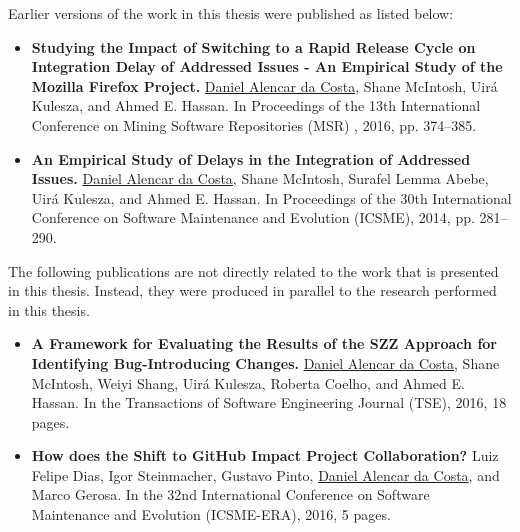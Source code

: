 \begin{sloppypar}

\noindent Earlier versions of the work in this thesis were published as listed below:

\begin{itemize}

\item \textbf{Studying the Impact of Switching to a Rapid Release Cycle on
Integration Delay of Addressed Issues - An Empirical Study of the Mozilla
Firefox Project.} 
\underline{Daniel Alencar da
	Costa}, Shane McIntosh, Uir\'{a} Kulesza,
	and Ahmed E. Hassan. In Proceedings of the 13th International
Conference on Mining Software Repositories (MSR) , 2016, pp. 374--385.\\
 \faTrophy

\item \textbf{An Empirical Study of Delays in the Integration of Addressed
Issues.} \underline{Daniel Alencar da Costa}, Shane McIntosh, Surafel Lemma Abebe,
Uir\'{a} Kulesza, and Ahmed E. Hassan. In Proceedings of the 30th International
Conference on Software Maintenance and Evolution (ICSME), 2014, pp. 281--290.\\
 \faTrophy

\end{itemize}

\noindent The following publications are not directly related to the work that
is presented in this thesis. Instead, they were produced in parallel to the
research performed in this thesis.

\begin{itemize}

\item \textbf{A Framework for Evaluating the Results of the SZZ Approach for
	Identifying Bug-Introducing Changes.} \underline{Daniel Alencar da
	Costa}, Shane McIntosh, Weiyi Shang, Uir\'{a} Kulesza, Roberta Coelho,
	and Ahmed E. Hassan. In the Transactions of Software Engineering Journal
	(TSE), 2016, 18 pages.

\item \textbf{How does the Shift to GitHub Impact Project Collaboration?} Luiz
	Felipe Dias, Igor Steinmacher, Gustavo Pinto, \underline{Daniel Alencar
	da Costa}, and Marco Gerosa. In the 32nd International Conference on
	Software Maintenance and Evolution (ICSME-ERA), 2016, 5 pages.


\end{itemize}
\end{sloppypar}
